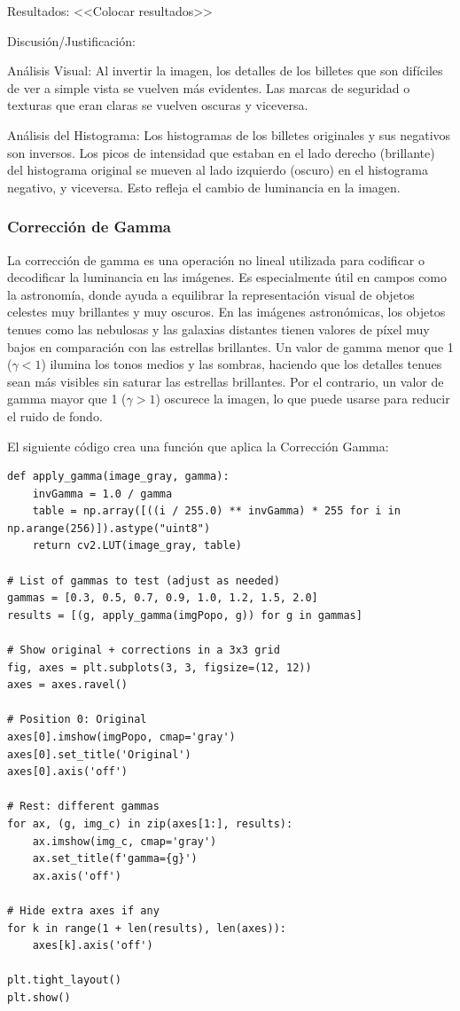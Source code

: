\documentclass[12pt,letterpaper]{article}
\begin{document}
Resultados:
<<Colocar resultados>>


Discusión/Justificación:

Análisis Visual: Al invertir la imagen, los detalles de los billetes que son difíciles de ver a simple vista se vuelven más evidentes. Las marcas de seguridad o texturas que eran claras se vuelven oscuras y viceversa.

Análisis del Histograma: Los histogramas de los billetes originales y sus negativos son inversos. Los picos de intensidad que estaban en el lado derecho (brillante) del histograma original se mueven al lado izquierdo (oscuro) en el histograma negativo, y viceversa. Esto refleja el cambio de luminancia en la imagen.

\subsubsection{Corrección de Gamma}

La corrección de gamma es una operación no lineal utilizada para codificar o decodificar la luminancia en las imágenes. Es especialmente útil en campos como la astronomía, donde ayuda a equilibrar la representación visual de objetos celestes muy brillantes y muy oscuros.
En las imágenes astronómicas, los objetos tenues como las nebulosas y las galaxias distantes tienen valores de píxel muy bajos en comparación con las estrellas brillantes. Un valor de gamma menor que 1 ($\gamma < 1$) ilumina los tonos medios y las sombras, haciendo que los detalles tenues sean más visibles sin saturar las estrellas brillantes. Por el contrario, un valor de gamma mayor que 1 ($\gamma > 1$) oscurece la imagen, lo que puede usarse para reducir el ruido de fondo.

El siguiente código crea una función que aplica la Corrección Gamma:

\begin{verbatim}
def apply_gamma(image_gray, gamma):
    invGamma = 1.0 / gamma
    table = np.array([((i / 255.0) ** invGamma) * 255 for i in np.arange(256)]).astype("uint8")
    return cv2.LUT(image_gray, table)

# List of gammas to test (adjust as needed)
gammas = [0.3, 0.5, 0.7, 0.9, 1.0, 1.2, 1.5, 2.0]
results = [(g, apply_gamma(imgPopo, g)) for g in gammas]

# Show original + corrections in a 3x3 grid
fig, axes = plt.subplots(3, 3, figsize=(12, 12))
axes = axes.ravel()

# Position 0: Original
axes[0].imshow(imgPopo, cmap='gray')
axes[0].set_title('Original')
axes[0].axis('off')

# Rest: different gammas
for ax, (g, img_c) in zip(axes[1:], results):
    ax.imshow(img_c, cmap='gray')
    ax.set_title(f'gamma={g}')
    ax.axis('off')

# Hide extra axes if any
for k in range(1 + len(results), len(axes)):
    axes[k].axis('off')

plt.tight_layout()
plt.show()
\end{verbatim}
\end{document}
